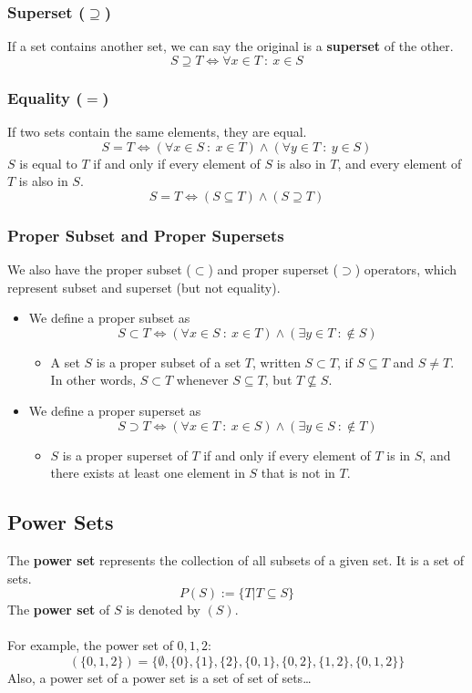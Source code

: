 \documentclass[10pt]{article}
\begin{document}
\subsubsection*{Superset ($\supseteq$)}
If a set contains another set, we can say the original is a \textbf{superset} of the other.
\[S \supseteq T \Leftrightarrow \forall x \in T \::\: x \in S\]

\subsubsection*{Equality ($=$)}
If two sets contain the same elements, they are equal.
\[S = T \Leftrightarrow (\forall x \in S\::\: x \in T) \land (\forall y \in T \::\: y \in S)\]
$S$ is equal to $T$ if and only if every element of $S$ is also in $T$, and every element of $T$ is also in $S$.
\[S = T \Leftrightarrow (S \subseteq T) \land (S \supseteq T)\]

\subsubsection*{Proper Subset and Proper Supersets}
We also have the proper subset ($\subset$) and proper superset ($\supset$) operators, which represent subset and superset (but not equality).
\begin{itemize}
	\item We define a proper subset as
	\[S \subset T \Leftrightarrow (\forall x \in S \::\: x \in T) \land (\exists y \in T \::\notin S)\]
    \begin{itemize}
	    \item A set $S$ is a proper subset of a set $T$, written $S \subset T$, if $S \subseteq T$ and $S \neq T$.  In other words, $S \subset T$ whenever $S \subseteq T$, but $T \nsubseteq S$.
    \end{itemize}
    \item We define a proper superset as
    \[S \supset T \Leftrightarrow (\forall x \in T \::\: x \in S) \land (\exists y \in S \::\notin T)\]
    \begin{itemize}
	    \item $S$ is a proper superset of $T$ if and only if every element of $T$ is in $S$, and there exists at least one element in $S$ that is not in $T$.
    \end{itemize}
\end{itemize}

\subsection*{Power Sets}
The \textbf{power set} represents the collection of all subsets of a given set.  It is a set of sets.
\[P(S) := \{T | T \subseteq S\}\]
The \textbf{power set} of $S$ is denoted by $(S)$.\\\\
For example, the power set of ${0, 1, 2}$:
\[(\{0, 1, 2\}) = \{\emptyset, \{0\}, \{1\}, \{2\}, \{0, 1\}, \{0, 2\}, \{1, 2\}, \{0, 1, 2\}\}\]
Also, a power set of a power set is a set of set of sets\dots
\end{document}
